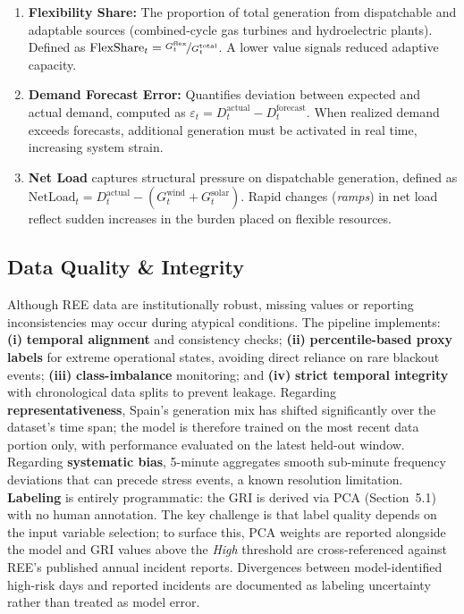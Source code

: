 \documentclass[11pt, a4paper]{article}
\begin{document}
\begin{enumerate}
  \item \textbf{Flexibility Share:} The proportion of total generation
        from dispatchable and adaptable sources (combined-cycle gas
        turbines and hydroelectric plants).  Defined as $\text{FlexShare}_t = \nicefrac{G^{\text{flex}}_t}{G^{\text{total}}_t}$. A lower value signals reduced adaptive capacity.

  \item \textbf{Demand Forecast Error:} Quantifies deviation between
        expected and actual demand, computed as
        $\varepsilon_t = D^{\text{actual}}_t - D^{\text{forecast}}_t$. When realized demand exceeds forecasts, additional generation must be activated in real time, increasing system strain.

  \item \textbf{Net Load} captures structural pressure on dispatchable generation, defined as $\text{NetLoad}_t = D^{\text{actual}}_t - (G^{\text{wind}}_t + G^{\text{solar}}_t)$. Rapid changes (\textit{ramps}) in net load reflect sudden increases in the burden placed on flexible resources.
\end{enumerate}

\subsection{Data Quality \& Integrity}

Although REE data are institutionally robust, missing values or reporting inconsistencies may occur during atypical conditions. The pipeline implements: \textbf{(i)} \textbf{temporal alignment} and consistency checks; \textbf{(ii)} \textbf{percentile-based proxy labels} for extreme operational states, avoiding direct reliance on rare blackout events; \textbf{(iii)} \textbf{class-imbalance} monitoring; and \textbf{(iv)} \textbf{strict temporal integrity} with chronological data splits to prevent leakage. Regarding \textbf{representativeness}, Spain's generation mix has shifted significantly over the dataset's time span; the model is therefore trained on the most recent data portion only, with performance evaluated on the latest held-out window. Regarding \textbf{systematic bias}, 5-minute aggregates smooth sub-minute frequency deviations that can precede stress events, a known resolution limitation. \textbf{Labeling} is entirely programmatic: the GRI is derived via PCA (Section~5.1) with no human annotation. The key challenge is that label quality depends on the input variable selection; to surface this, PCA weights are reported alongside the model and GRI values above the \textit{High} threshold are cross-referenced against REE's published annual incident reports. Divergences between model-identified high-risk days and reported incidents are documented as labeling uncertainty rather than treated as model error.
\end{document}
